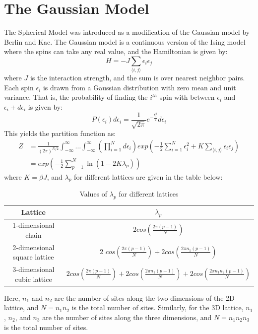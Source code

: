 \documentclass{article}
\begin{document}
\section{The Gaussian Model}
The Spherical Model was introduced as a modification of the Gaussian model by Berlin and Kac. The Gaussian model is a continuous version of the Ising model where the spins can take any real value, and the Hamiltonian is given by:
\begin{equation}
    H = -J \sum_{\langle i,j \rangle} \epsilon_i \epsilon_j
\end{equation}
where $J$ is the interaction strength, and the sum is over nearest neighbor pairs. Each spin $\epsilon_i$ is drawn from a Gaussian distribution with zero mean and unit variance. That is, the probability of finding the $i^{th}$ spin with between $\epsilon_i$ and $\epsilon_i + d\epsilon_i$ is given by:
\begin{equation}
    P(\epsilon_i) d\epsilon_i = \frac{1}{\sqrt{2\pi}} e^{-\frac{\epsilon_i^2}{2}} d\epsilon_i
\end{equation}
This yields the partition function as:
\begin{align}
    Z &=  \frac{1}{(2\pi)^{N/2}} \int_{-\infty}^{\infty} \ldots \int_{-\infty}^{\infty} \left( \prod_{i=1}^{N} d\epsilon_i \right) exp \left( -\frac{1}{2} \sum_{i=1}^{N} \epsilon_i^2 + K \sum_{\langle i,j \rangle} \epsilon_i \epsilon_j \right) \\
     & = exp \left( -\frac{1}{2} \sum_{p=1}^{N} \ln(1 - 2 K \lambda_p) \right)
\end{align}
where $K = \beta J$, and $\lambda_p$ for different lattices are given in the table below:
\begin{table}[h!]
    \centering
    \begin{tabular}{|c|c|}
        \hline
        Lattice & $\lambda_p$ \\
        \hline \hline
        1-dimensional chain & $2 cos\left(\frac{2 \pi (p-1)}{N} \right)$ \\
        \hline
        2-dimensional square lattice & 2 $cos\left(\frac{2 \pi (p-1)}{N} \right) + 2 cos\left(\frac{2 \pi n_1 (p-1) }{N} \right)$ \\
        \hline
        3-dimensional cubic lattice & $2 cos\left(\frac{2 \pi (p-1)}{N} \right) + 2 cos\left(\frac{2 \pi n_1 (p-1) }{N} \right) + 2 cos\left(\frac{2 \pi n_1 n_2 (p-1) }{N} \right)$ \\
        \hline
    \end{tabular}
    \caption{Values of $\lambda_p$ for different lattices}
    \label{tab:lambda}
\end{table}


Here, $n_1$ and $n_2$ are the number of sites along the two dimensions of the 2D lattice, and $N = n_1 n_2$ is the total number of sites. Similarly, for the 3D lattice, $n_1$, $n_2$, and $n_3$ are the number of sites along the three dimensions, and $N = n_1 n_2 n_3$ is the total number of sites.




\nocite{*}
\end{document}
